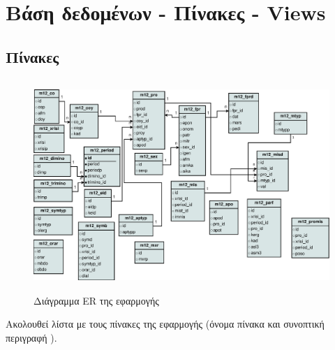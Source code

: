 \documentclass[A4,10pt,greek]{book}
\begin{document}
\section{Βάση δεδομένων - Πίνακες - Views }
\subsection{Πίνακες}
\begin{figure}[!htb]
\includegraphics[width=150mm,height=80mm]{m13.eps}
\caption{Διάγραμμα ER της εφαρμογής}
\label{fig:diagrEr}
\end{figure}
Ακολουθεί λίστα με τους πίνακες της εφαρμογής (όνομα πίνακα και συνοπτική περιγραφή ).
\end{document}
